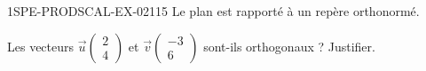 \begin{exercice}{1SPE-PRODSCAL-EX-021}{1}{5}
Le plan est rapporté à un repère orthonormé.

Les vecteurs $\vec{u}\begin{pmatrix} 2 \\ 4 \end{pmatrix}$ et $\vec{v}\begin{pmatrix} -3 \\ 6 \end{pmatrix}$ sont-ils orthogonaux ? Justifier.
\end{exercice}
